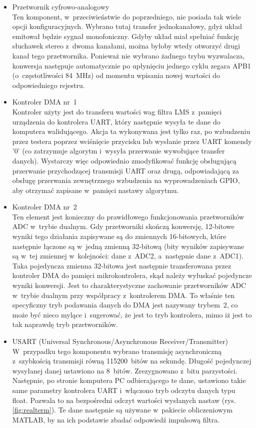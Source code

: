 \begin{itemize}
	\item Przetwornik cyfrowo-analogowy\\
	Ten komponent, w~przeciwieństwie do poprzedniego, nie posiada tak wiele opcji konfiguracyjnych. Wybrano tutaj transfer jednokanałowy, gdyż układ emitował będzie sygnał monofoniczny. Gdyby układ miał spełniać funkcję słuchawek stereo z~dwoma kanałami, można byłoby wtedy otworzyć drugi kanał tego przetwornika. Ponieważ nie wybrano żadnego trybu wyzwalacza, konwersja następuje automatycznie po upłynięciu jednego cyklu zegara APB1 (o~częstotliwości \SI{84}{\MHz}) od momentu wpisania nowej wartości do odpowiedniego rejestru.
	\item Kontroler DMA nr~1\\
	Kontroler użyty jest do transferu wartości wag filtra LMS z~pamięci urządzenia do kontrolera UART, który następnie wysyła te dane do komputera walidującego. Akcja ta wykonywana jest tylko raz, po wzbudzeniu przez testera poprzez wciśnięcie przycisku lub wysłanie przez UART komendy '0' (co zatrzymuje algorytm i~wysyła przerwanie wywołujące transfer danych). Wystarczy więc odpowiednio zmodyfikować funkcję obsługującą przerwanie przychodzącej transmisji UART oraz drugą, odpowiadającą za obsługę przerwania zewnętrznego wzbudzenia na wyprowadzeniach GPIO, aby otrzymać zapisane w~pamięci nastawy algorytmu.
	\item Kontroler DMA nr~2\\
	Ten element jest konieczny do prawidłowego funkcjonowania przetworników ADC w~trybie dualnym. Gdy przetworniki skończą konwersję, 12-bitowe wyniki tego działania zapisywane są do zmiennych 16-bitowych, które następnie łączone są w~jedną zmienną 32-bitową (bity wyników zapisywane są w~tej zmiennej w~kolejności: dane z~ADC2, a~następnie dane z~ADC1). Taka pojedyncza zmienna 32-bitowa jest następnie transferowana przez kontroler DMA do pamięci mikrokontrolera, skąd należy wyłuskać pojedyncze wyniki konwersji. Jest to charakterystyczne zachowanie przetworników ADC w~trybie dualnym przy współpracy z~kontrolerem DMA. To właśnie ten specyficzny tryb podawania danych do DMA jest nazywany trybem~2, co może być nieco mylące i~sugerować, że jest to tryb kontrolera, mimo iż jest to tak naprawdę tryb przetworników.
	\item USART (Universal Synchronous/Asynchronous Receiver/Transmitter)\\
	W~przypadku tego komponentu wybrano transmisję asynchroniczną z~szybkością transmisji równą 115200~bitów na sekundę. Długość pojedynczej wysyłanej danej ustawiono na 8~bitów. Zrezygnowano z~bitu parzystości. Następnie, po stronie komputera PC odbierającego te dane, ustawiono takie same parametry kontrolera UART i~włączono tryb odczytu danych typu float. Pozwala to na bezpośredni odczyt wartości wysłanych nastaw (rys. \ref{fig:realterm}). Te dane następnie są używane w~pakiecie obliczeniowym MATLAB, by na ich podstawie zbadać odpowiedź impulsową filtra.

\end{itemize}

